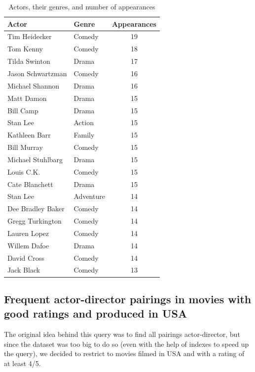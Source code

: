 \documentclass{Configuration_Files/PoliMi3i_thesis}
\begin{document}
\begin{table}[h!]
\centering
\begin{tabular}{|l|l|c|}
\hline
\textbf{Actor} & \textbf{Genre} & \textbf{Appearances} \\ \hline
Tim Heidecker & Comedy & 19 \\ \hline
Tom Kenny & Comedy & 18 \\ \hline
Tilda Swinton & Drama & 17 \\ \hline
Jason Schwartzman & Comedy & 16 \\ \hline
Michael Shannon & Drama & 16 \\ \hline
Matt Damon & Drama & 15 \\ \hline
Bill Camp & Drama & 15 \\ \hline
Stan Lee & Action & 15 \\ \hline
Kathleen Barr & Family & 15 \\ \hline
Bill Murray & Comedy & 15 \\ \hline
Michael Stuhlbarg & Drama & 15 \\ \hline
Louis C.K. & Comedy & 15 \\ \hline
Cate Blanchett & Drama & 15 \\ \hline
Stan Lee & Adventure & 14 \\ \hline
Dee Bradley Baker & Comedy & 14 \\ \hline
Gregg Turkington & Comedy & 14 \\ \hline
Lauren Lopez & Comedy & 14 \\ \hline
Willem Dafoe & Drama & 14 \\ \hline
David Cross & Comedy & 14 \\ \hline
Jack Black & Comedy & 13 \\ \hline
\end{tabular}
\caption{Actors, their genres, and number of appearances}
\label{tab:actor_genres}
\end{table}

\subsection{Frequent actor-director pairings in movies with good ratings and produced in USA
}

The original idea behind this query was to find all pairings actor-director, but since the dataset was too big to do so (even with the help of indexes to speed up the query), we decided to restrict to movies filmed in USA and with a rating of at least 4/5.
\end{document}
